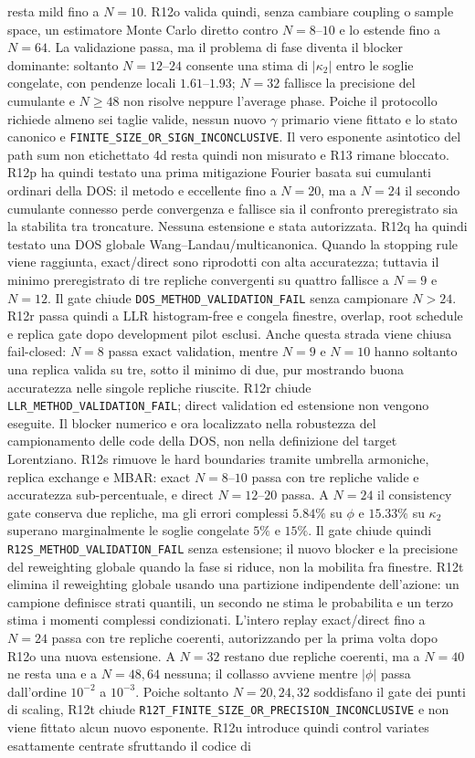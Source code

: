 \documentclass[11pt,a4paper]{article}
\begin{document}
resta mild fino a $N=10$. R12o valida quindi, senza cambiare coupling o sample space, un estimatore Monte Carlo diretto contro $N=8$--$10$ e lo estende fino a $N=64$. La validazione passa, ma il problema di fase diventa il blocker dominante: soltanto $N=12$--$24$ consente una stima di $|\kappa_2|$ entro le soglie congelate, con pendenze locali $1.61$--$1.93$; $N=32$ fallisce la precisione del cumulante e $N\ge48$ non risolve neppure l'average phase. Poiche il protocollo richiede almeno sei taglie valide, nessun nuovo $\gamma$ primario viene fittato e lo stato canonico e \texttt{FINITE\_SIZE\_OR\_SIGN\_INCONCLUSIVE}. Il vero esponente asintotico del path sum non etichettato 4d resta quindi non misurato e R13 rimane bloccato. R12p ha quindi testato una prima mitigazione Fourier basata sui cumulanti ordinari della DOS: il metodo e eccellente fino a $N=20$, ma a $N=24$ il secondo cumulante connesso perde convergenza e fallisce sia il confronto preregistrato sia la stabilita tra troncature. Nessuna estensione e stata autorizzata. R12q ha quindi testato una DOS globale Wang--Landau/multicanonica. Quando la stopping rule viene raggiunta, exact/direct sono riprodotti con alta accuratezza; tuttavia il minimo preregistrato di tre repliche convergenti su quattro fallisce a $N=9$ e $N=12$. Il gate chiude \texttt{DOS\_METHOD\_VALIDATION\_FAIL} senza campionare $N>24$. R12r passa quindi a LLR histogram-free e congela finestre, overlap, root schedule e replica gate dopo development pilot esclusi. Anche questa strada viene chiusa fail-closed: $N=8$ passa exact validation, mentre $N=9$ e $N=10$ hanno soltanto una replica valida su tre, sotto il minimo di due, pur mostrando buona accuratezza nelle singole repliche riuscite. R12r chiude \texttt{LLR\_METHOD\_VALIDATION\_FAIL}; direct validation ed estensione non vengono eseguite. Il blocker numerico e ora localizzato nella robustezza del campionamento delle code della DOS, non nella definizione del target Lorentziano. R12s rimuove le hard boundaries tramite umbrella armoniche, replica exchange e MBAR: exact $N=8$--$10$ passa con tre repliche valide e accuratezza sub-percentuale, e direct $N=12$--$20$ passa. A $N=24$ il consistency gate conserva due repliche, ma gli errori complessi $5.84\%$ su $\phi$ e $15.33\%$ su $\kappa_2$ superano marginalmente le soglie congelate $5\%$ e $15\%$. Il gate chiude quindi \texttt{R12S\_METHOD\_VALIDATION\_FAIL} senza estensione; il nuovo blocker e la precisione del reweighting globale quando la fase si riduce, non la mobilita fra finestre. R12t elimina il reweighting globale usando una partizione indipendente dell'azione: un campione definisce strati quantili, un secondo ne stima le probabilita e un terzo stima i momenti complessi condizionati. L'intero replay exact/direct fino a $N=24$ passa con tre repliche coerenti, autorizzando per la prima volta dopo R12o una nuova estensione. A $N=32$ restano due repliche coerenti, ma a $N=40$ ne resta una e a $N=48,64$ nessuna; il collasso avviene mentre $|\phi|$ passa dall'ordine $10^{-2}$ a $10^{-3}$. Poiche soltanto $N=20,24,32$ soddisfano il gate dei punti di scaling, R12t chiude \texttt{R12T\_FINITE\_SIZE\_OR\_PRECISION\_INCONCLUSIVE} e non viene fittato alcun nuovo esponente. R12u introduce quindi control variates esattamente centrate sfruttando il codice di 
\end{document}
